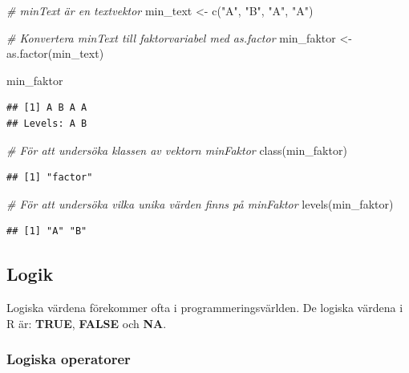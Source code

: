 \documentclass[
]{book}
\newenvironment{Shaded}{\begin{snugshade}}{\end{snugshade}}
\newcommand{\CommentTok}[1]{\textcolor[rgb]{0.56,0.35,0.01}{\textit{#1}}}
\newcommand{\FunctionTok}[1]{\textcolor[rgb]{0.00,0.00,0.00}{#1}}
\newcommand{\NormalTok}[1]{#1}
\newcommand{\OtherTok}[1]{\textcolor[rgb]{0.56,0.35,0.01}{#1}}
\newcommand{\StringTok}[1]{\textcolor[rgb]{0.31,0.60,0.02}{#1}}
\begin{document}
\begin{Shaded}
\begin{Highlighting}[]
\CommentTok{\# minText är en textvektor}
\NormalTok{min\_text }\OtherTok{\textless{}{-}} \FunctionTok{c}\NormalTok{(}\StringTok{"A"}\NormalTok{, }\StringTok{"B"}\NormalTok{, }\StringTok{"A"}\NormalTok{, }\StringTok{"A"}\NormalTok{)}

\CommentTok{\# Konvertera minText till faktorvariabel med as.factor}
\NormalTok{min\_faktor }\OtherTok{\textless{}{-}} \FunctionTok{as.factor}\NormalTok{(min\_text)}

\NormalTok{min\_faktor}
\end{Highlighting}
\end{Shaded}

\begin{verbatim}
## [1] A B A A
## Levels: A B
\end{verbatim}

\begin{Shaded}
\begin{Highlighting}[]
\CommentTok{\# För att undersöka klassen av vektorn minFaktor}
\FunctionTok{class}\NormalTok{(min\_faktor)}
\end{Highlighting}
\end{Shaded}

\begin{verbatim}
## [1] "factor"
\end{verbatim}

\begin{Shaded}
\begin{Highlighting}[]
\CommentTok{\# För att undersöka vilka unika värden finns på minFaktor }
\FunctionTok{levels}\NormalTok{(min\_faktor)}
\end{Highlighting}
\end{Shaded}

\begin{verbatim}
## [1] "A" "B"
\end{verbatim}

\hypertarget{logik}{%
\subsection{Logik}\label{logik}}

Logiska värdena förekommer ofta i programmeringsvärlden. De logiska värdena i R är: \textbf{TRUE}, \textbf{FALSE} och \textbf{NA}.

\hypertarget{logiska-operatorer}{%
\subsubsection{Logiska operatorer}\label{logiska-operatorer}}
\end{document}
